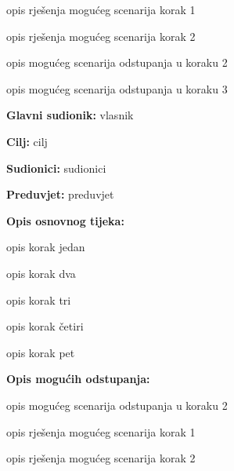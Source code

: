 \begin{packed_enum}
\begin{packed_item}
\begin{packed_item}
\begin{packed_enum}
								\item opis rješenja mogućeg scenarija korak 1
								\item opis rješenja mogućeg scenarija korak 2
								
							\end{packed_enum}
							\item[2.b] opis mogućeg scenarija odstupanja u koraku 2
							\item[3.a] opis mogućeg scenarija odstupanja  u koraku 3
							
						\end{packed_item}
					\end{packed_item}
					
					\noindent {}
					\begin{packed_item}
						
						\item \textbf{Glavni sudionik: }vlasnik
						\item  \textbf{Cilj:} cilj
						\item  \textbf{Sudionici:} sudionici
						\item  \textbf{Preduvjet:} preduvjet
						\item  \textbf{Opis osnovnog tijeka:}
						
						\item[] \begin{packed_enum}
							
							\item opis korak jedan
							\item opis korak dva
							\item opis korak tri
							\item opis korak četiri
							\item opis korak pet
						\end{packed_enum}
						
						\item  \textbf{Opis mogućih odstupanja:}
						
						\item[] \begin{packed_item}
							
							\item[2.a] opis mogućeg scenarija odstupanja u koraku 2
							\item[] \begin{packed_enum}
								
								\item opis rješenja mogućeg scenarija korak 1
								\item opis rješenja mogućeg scenarija korak 2
								

\end{packed_enum}
\end{packed_item}
\end{packed_item}
\end{packed_enum}

